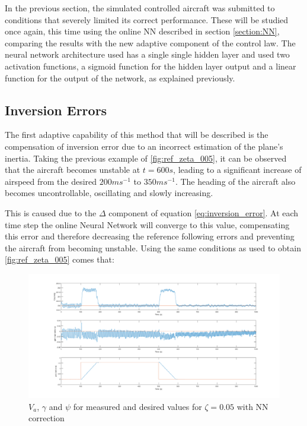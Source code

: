 In the previous section, the simulated controlled aircraft was submitted to conditions that severely limited its correct performance. These will be studied once again, this time using the online NN described in section \ref{section:NN}, comparing the results with the new adaptive component of the control law. The neural network architecture used has a single single hidden layer and used two activation functions, a sigmoid function for the hidden layer output and a linear function for the output of the network, as explained previously. 




\subsection{Inversion Errors}

The first adaptive capability of this method that will be described is the compensation of inversion error due to an incorrect estimation of the plane's inertia. Taking the previous example of \ref{fig:ref_zeta_005}, it can be observed that the aircraft becomes unstable at $t=600s$, leading to a significant increase of airspeed from the desired $200ms^{-1}$ to $350ms^{-1}$. The heading of the aircraft also becomes uncontrollable, oscillating and slowly increasing. 

This is caused due to the $\Delta$ component of equation \ref{eq:inversion_error}. At each time step the online Neural Network will converge to this value, compensating this error and therefore decreasing the reference following errors and preventing the aircraft from becoming unstable. Using the same conditions as used to obtain \ref{fig:ref_zeta_005} comes that:

\begin{figure}[H]
\centering
\includegraphics[width=\textwidth]{Figures/Results/ref_zeta_005_NN.png}
\caption[Reference tracking for $\zeta=0.05$ with NN correction]{$V_a$, $\gamma$ and $\psi$ for measured and desired values for $\zeta=0.05$ with NN correction}
\label{fig:ref_zeta_005_NN}
\end{figure}

